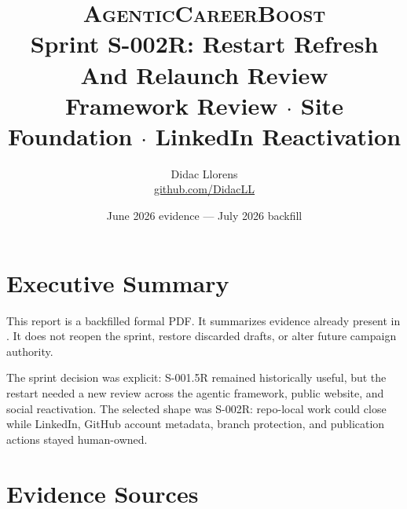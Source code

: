 \documentclass[a4paper,11pt,openany]{report}
\title{%
  \textsc{AgenticCareerBoost}\\[0.4em]
  \Large Sprint S-002R: Restart Refresh And Relaunch Review\\[0.3em]
  \large Framework Review $\cdot$ Site Foundation $\cdot$ LinkedIn Reactivation%
}
\author{Didac Llorens \\ \small \href{https://github.com/DidacLL}{github.com/DidacLL}}
\date{June 2026 evidence --- July 2026 backfill}
\begin{document}
\maketitle
\tableofcontents
\newpage

\chapter{Executive Summary}


This report is a backfilled formal PDF. It summarizes evidence already present
in . It does not reopen the sprint,
restore discarded drafts, or alter future campaign authority.

The sprint decision was explicit: S-001.5R remained historically useful, but the
restart needed a new review across the agentic framework, public website, and
social reactivation. The selected shape was S-002R: repo-local work could close
while LinkedIn, GitHub account metadata, branch protection, and publication
actions stayed human-owned.

\chapter{Evidence Sources}
\end{document}
